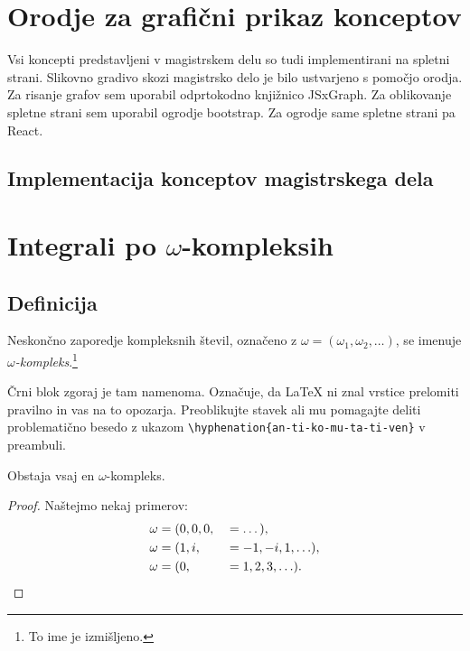 \documentclass[isrm2, tisk]{fmfdelo}
\begin{document}
    \section{Orodje za grafični prikaz konceptov}
    Vsi koncepti predstavljeni v magistrskem delu so tudi implementirani na spletni strani.
    Slikovno gradivo skozi magistrsko delo je bilo ustvarjeno s pomočjo orodja.
    Za risanje grafov sem uporabil odprtokodno knjižnico JSxGraph.
    Za oblikovanje spletne strani sem uporabil ogrodje bootstrap.
    Za ogrodje same spletne strani pa React.

    \subsection{Implementacija konceptov magistrskega dela}


    \newpage


    \section{Integrali po \texorpdfstring{$\omega$}{ω}-kompleksih}

    \subsection{Definicija}
    \begin{definicija}
        Neskončno zaporedje kompleksnih števil, označeno z $\omega = (\omega_1, \omega_2, \ldots)$,
        se imenuje \emph{$\omega$-kompleks}.\footnote{To ime je izmišljeno.}

        Črni blok zgoraj je tam namenoma. Označuje, da \LaTeX{} ni znal vrstice prelomiti pravilno
        in vas na to opozarja. Preoblikujte stavek ali mu pomagajte deliti problematično besedo z
        ukazom \verb|\hyphenation{an-ti-ko-mu-ta-ti-ven}| v preambuli.
    \end{definicija}
    \begin{trditev}
        \label{trd:obstoj-omega}
        Obstaja vsaj en $\omega$-kompleks.
    \end{trditev}
    \begin{proof}
        Naštejmo nekaj primerov:
        \begin{align}
            \omega &= (0, 0, 0,& &= \dots), \label{eq:zero-kompleks} \\
            \omega &= (1, i, & &=-1, -i, 1, \ldots), \nonumber \\
            \omega &= (0,& &= 1, 2, 3, \ldots). \nonumber \qedhere  %
        \end{align}
    \end{proof}
\end{document}
